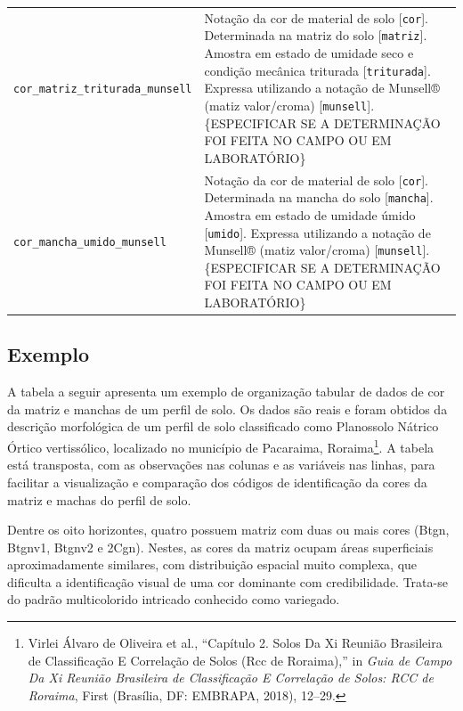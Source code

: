 \documentclass[a4paper,dvipsnames]{tufte-book}
\begin{document}
\begin{longtable}[]{@{}ll@{}}
\begin{minipage}[t]{0.41\columnwidth}
\texttt{cor\_matriz\_triturada\_munsell}\strut
\end{minipage} & \begin{minipage}[t]{0.34\columnwidth}\raggedright\strut
Notação da cor de material de solo {[}\texttt{cor}{]}. Determinada na
matriz do solo {[}\texttt{matriz}{]}. Amostra em estado de umidade seco
e condição mecânica triturada {[}\texttt{triturada}{]}. Expressa
utilizando a notação de Munsell® (matiz valor/croma)
{[}\texttt{munsell}{]}. \{ESPECIFICAR SE A DETERMINAÇÃO FOI FEITA NO
CAMPO OU EM LABORATÓRIO\}\strut
\end{minipage}\tabularnewline
\begin{minipage}[t]{0.41\columnwidth}\raggedright\strut
\texttt{cor\_mancha\_umido\_munsell}\strut
\end{minipage} & \begin{minipage}[t]{0.34\columnwidth}\raggedright\strut
Notação da cor de material de solo {[}\texttt{cor}{]}. Determinada na
mancha do solo {[}\texttt{mancha}{]}. Amostra em estado de umidade úmido
{[}\texttt{umido}{]}. Expressa utilizando a notação de Munsell® (matiz
valor/croma) {[}\texttt{munsell}{]}. \{ESPECIFICAR SE A DETERMINAÇÃO FOI
FEITA NO CAMPO OU EM LABORATÓRIO\}\strut
\end{minipage}\tabularnewline
\bottomrule
\end{longtable}

\subsection{Exemplo}\label{exemplo}

A tabela a seguir apresenta um exemplo de organização tabular de dados
de cor da matriz e manchas de um perfil de solo. Os dados são reais e
foram obtidos da descrição morfológica de um perfil de solo classificado
como Planossolo Nátrico Órtico vertissólico, localizado no município de
Pacaraima, Roraima\footnote{Virlei Álvaro de Oliveira et al., ``Capítulo
  2. Solos Da Xi Reunião Brasileira de Classificação E Correlação de
  Solos (Rcc de Roraima),'' in \emph{Guia de Campo Da Xi Reunião
  Brasileira de Classificação E Correlação de Solos: RCC de Roraima},
  First (Brasília, DF: EMBRAPA, 2018), 12--29.}. A tabela está
transposta, com as observações nas colunas e as variáveis nas linhas,
para facilitar a visualização e comparação dos códigos de identificação
da cores da matriz e machas do perfil de solo.

Dentre os oito horizontes, quatro possuem matriz com duas ou mais cores
(Btgn, Btgnv1, Btgnv2 e 2Cgn). Nestes, as cores da matriz ocupam áreas
superficiais aproximadamente similares, com distribuição espacial muito
complexa, que dificulta a identificação visual de uma cor dominante com
credibilidade. Trata-se do padrão multicolorido intricado conhecido como
variegado.
\end{document}
